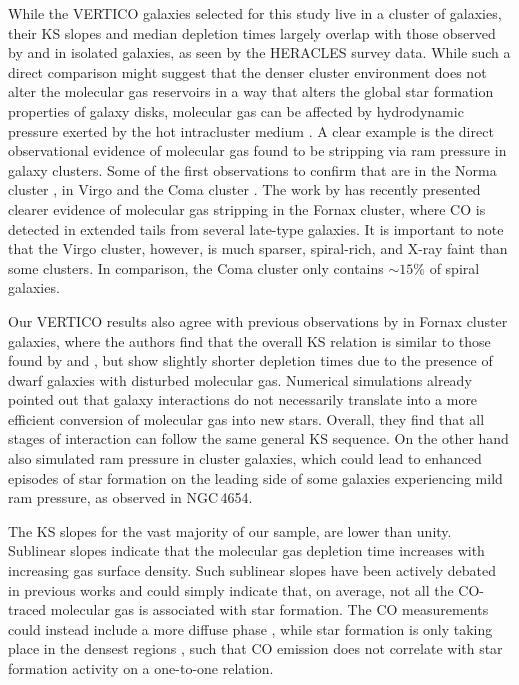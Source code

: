 \documentclass[longauth]{aa}
\begin{document}
While the VERTICO galaxies selected for this study live in a cluster of galaxies, their KS slopes and median depletion times largely overlap with those observed by \citet{Bigiel2008} and \citet{Leroy2013} in isolated galaxies, as seen by the HERACLES survey data. While such a direct comparison might suggest that the denser cluster environment does not alter the molecular gas reservoirs in a way that alters the global star formation properties of galaxy disks, molecular gas can be affected by hydrodynamic pressure exerted by the hot intracluster medium \citep{Tonnesen2009,Lee2020}. A clear example is the direct observational evidence of molecular gas found to be stripping via ram pressure in galaxy clusters. Some of the first observations to confirm that are in the Norma cluster \citep{Jachym2014}, in Virgo \citep{Verdugo2015} and the Coma cluster \citep{Jachym2017}. The work by \citet{Zabel2019} has recently presented clearer evidence of molecular gas stripping in the Fornax cluster, where CO is detected in extended tails from several late-type galaxies. It is important to note that the Virgo cluster, however, is much sparser, spiral-rich, and X-ray faint than some clusters. In comparison, the Coma cluster only contains $\sim 15\%$ of spiral galaxies.

Our VERTICO results also agree with previous observations by \citet{Zabel2020} in Fornax cluster galaxies, where the authors find that the overall KS relation is similar to those found by \citet{Kennicutt1998} and \citet{Bigiel2008}, but show slightly shorter depletion times due to the presence of dwarf galaxies with disturbed molecular gas. Numerical simulations \citep[e.g.,][]{diMatteo2007} already pointed out that galaxy interactions do not necessarily translate into a more efficient conversion of molecular gas into new stars. Overall, they find that all stages of interaction can follow the same general KS sequence. On the other hand \citet{Roediger2007,Roediger2008} also simulated ram pressure in cluster galaxies, which could lead to enhanced episodes of star formation on the leading side of some galaxies experiencing mild ram pressure, as observed in NGC\,4654.

The KS slopes for the vast majority of our sample, are lower than unity. Sublinear slopes indicate that the molecular gas depletion time increases with increasing gas surface density. Such sublinear slopes have been actively debated in previous works \citep[e.g.,][]{Shetty2013,Shetty2014} and could simply indicate that, on average, not all the CO-traced molecular gas is associated with star formation. The CO measurements could instead include a more diffuse phase \citep{Rahman2011,Pety2013}, while star formation is only taking place in the densest regions \citep[e.g.,][]{Gao2004}, such that CO emission does not correlate with star formation activity on a one-to-one relation. 
\end{document}
